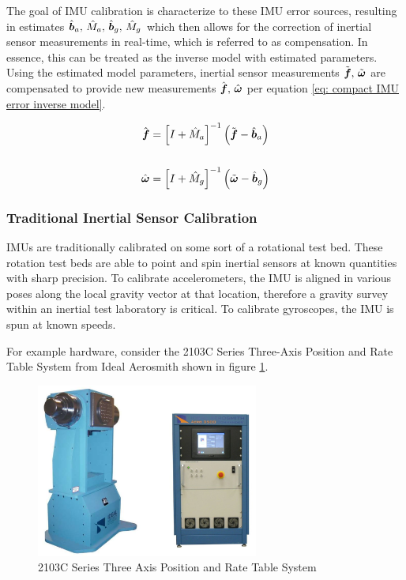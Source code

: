 The goal of IMU calibration is characterize to these IMU error sources, resulting in estimates $\hat{\boldsymbol{b}}_a, \, \hat{M}_a, \, \hat{\boldsymbol{b}}_g, \, \hat{M}_g
$ which then allows for the correction of inertial sensor measurements in real-time, which is referred to as compensation. In essence, this can be treated as the inverse model with estimated parameters. Using the estimated model parameters, inertial sensor measurements $\tilde{\boldsymbol{f}},\,\tilde{\boldsymbol{\omega}}$ are compensated to provide new measurements $\hat{\boldsymbol{f}},\,\hat{\boldsymbol{\omega}}$ per equation \ref{eq: compact IMU error inverse model}.

\begin{align} \label{eq: compact IMU error inverse model}
	\hat{\boldsymbol{f}} &= \left[I + \hat{M}_a\right]^{-1} \left(\tilde{\boldsymbol{f}} - \hat{\boldsymbol{b}}_a\right) \notag\\
	\\
	\hat{\boldsymbol{\omega}} &= \left[I + \hat{M}_g\right]^{-1} \left(\tilde{\boldsymbol{\omega}} - \hat{\boldsymbol{b}}_g\right) \notag
\end{align}


\subsubsection{Traditional Inertial Sensor Calibration}

IMUs are traditionally calibrated on some sort of a rotational test bed. These rotation test beds are able to point and spin inertial sensors at known quantities with sharp precision. To calibrate accelerometers, the IMU is aligned in various poses along the local gravity vector at that location, therefore a gravity survey within an inertial test laboratory is critical. To calibrate gyroscopes, the IMU is spun at known speeds.

For example hardware, consider the 2103C Series Three-Axis Position and Rate Table System from Ideal Aerosmith shown in figure \ref{fig: three axis rate table example}. 

\begin{figure}[h] 
	\centering
	\includegraphics[width=0.65\textwidth]{./images/three_axis_rate_table_example.png}
	\caption{2103C Series Three Axis Position and Rate Table System}
	\label{fig: three axis rate table example}
\end{figure}
\FloatBarrier

